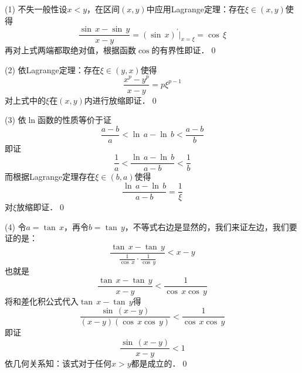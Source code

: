 (1) \prove 不失一般性设$x<y$，在区间$(x,y)$中应用Lagrange定理：存在$\xi \in (x,y)$使得
\begin{equation}
    \frac{\sin \, x - \sin \, y}{x-y} = \left(\sin \, x\right)^\prime \bigg\vert_{x = \xi} = \cos \, \xi
\end{equation}
再对上式两端都取绝对值，根据函数$\cos $的有界性即证．\qed\bigskip

(2) \prove 依Lagrange定理：存在$\xi \in (y, x)$使得
\begin{equation}
    \frac{x^p-y^p}{x-y} = p \xi^{p-1}
\end{equation}
对上式中的$\xi$在$(x,y)$内进行放缩即证．\qed\bigskip

(3) \prove 依$\ln$函数的性质等价于证
\begin{equation}
    \frac{a-b}{a} < \ln \, a - \ln \, b < \frac{a-b}{b}
\end{equation}
即证
\begin{equation}
    \frac{1}{a} < \frac{\ln \, a - \ln \, b}{a-b} < \frac{1}{b}
\end{equation}
而根据Lagrange定理存在$\xi \in (b,a)$使得
\begin{equation}
    \frac{\ln \, a - \ln \, b}{a-b} = \frac{1}{\xi}
\end{equation}
对$\xi$放缩即证．\qed\bigskip

(4) \prove 令$a = \tan \, x$，再令$b = \tan \, y$，不等式右边是显然的，我们来证左边，我们要证的是：
\begin{equation}
    \frac{\tan \, x - \tan \, y}{\displaystyle\frac{1}{\cos \, x}\cdot \displaystyle\frac{1}{\cos \, y}} < x - y
\end{equation}
也就是
\begin{equation}
    \frac{\tan \, x - \tan \, y}{x-y} < \frac{1}{\cos \, x \cos \, y}
\end{equation}
将和差化积公式代入$\tan \, x - \tan \, y$得
\begin{equation}
    \frac{\sin \, \left(x-y\right)}{\left(x-y\right)(\cos \, x \cos \, y)} < \frac{1}{\cos \, x \cos \, y}
\end{equation}
即证
\begin{equation}
    \frac{\sin \, \left(x-y\right)}{x-y} < 1
\end{equation}
依几何关系知：该式对于任何$x>y$都是成立的．\qed\bigskip